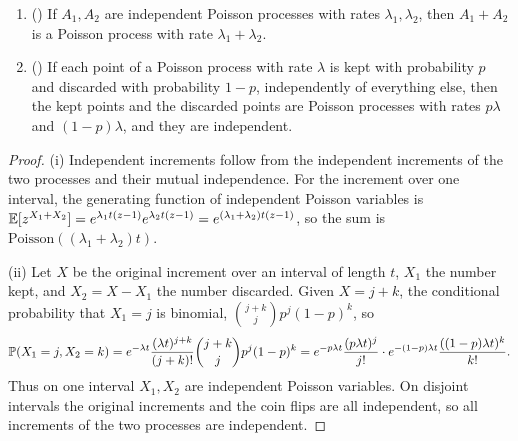 \begin{proposition}\label{prop:superpose}
\begin{enumerate}[label=(\roman*)]
\item () If $A_1,A_2$ are independent Poisson processes with rates
  $\lambda_1,\lambda_2$, then $A_1+A_2$ is a Poisson process with rate
  $\lambda_1+\lambda_2$.
\item () If each point of a Poisson process with rate $\lambda$ is kept
  with probability $p$ and discarded with probability $1-p$, independently of
  everything else, then the kept points and the discarded points are Poisson
  processes with rates $p\lambda$ and $(1-p)\lambda$, and they are independent.
\end{enumerate}
\end{proposition}

\begin{proof}
(i) Independent increments follow from the independent increments of the two
processes and their mutual independence. For the increment over one interval, the
generating function of independent Poisson variables is
$\mathbb{E}[z^{X_1+X_2}]=e^{\lambda_1t(z-1)}e^{\lambda_2t(z-1)}=e^{(\lambda_1+\lambda_2)t(z-1)}$,
so the sum is $\mathrm{Poisson}((\lambda_1+\lambda_2)t)$.

(ii) Let $X$ be the original increment over an interval of length $t$, $X_1$ the number
kept, and $X_2=X-X_1$ the number discarded. Given $X=j+k$, the conditional
probability that $X_1=j$ is binomial, $\binom{j+k}{j}p^j(1-p)^k$, so
\[
  \mathbb{P}(X_1=j,X_2=k)=e^{-\lambda t}\frac{(\lambda t)^{j+k}}{(j+k)!}\binom{j+k}{j}p^j(1-p)^k
  =e^{-p\lambda t}\frac{(p\lambda t)^j}{j!}\cdot e^{-(1-p)\lambda t}\frac{((1-p)\lambda t)^k}{k!}.
\]
Thus on one interval $X_1,X_2$ are independent Poisson variables. On disjoint
intervals the original increments and the coin flips are all independent, so all
increments of the two processes are independent.
\end{proof}


